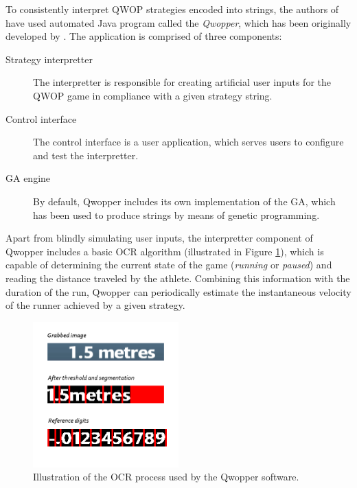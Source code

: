 To consistently interpret QWOP strategies encoded into strings, the authors of \cite{EvolvingQwopGaits} have used automated Java program called the \textit{Qwopper}, which has been originally developed by \cite{QwopEncoding}. The application is comprised of three components:
~
\begin{description}
	\item[Strategy interpretter]
	The interpretter is responsible for creating artificial user inputs for the QWOP game in compliance with a given strategy string.

	\item[Control interface]
	The control interface is a user application, which serves users to configure and test the interpretter.

	\item[GA engine]
	By default, Qwopper includes its own implementation of the GA, which has been used to produce strings by means of genetic programming.
\end{description}

Apart from blindly simulating user inputs, the interpretter component of Qwopper includes a basic OCR algorithm (illustrated in Figure \ref{figure:QWOP-OCR}), which is capable of determining the current state of the game (\textit{running} or \textit{paused}) and reading the distance traveled by the athlete. Combining this information with the duration of the run, Qwopper can periodically estimate the instantaneous velocity of the runner achieved by a given strategy.

\begin{figure}[ht]
	\centering
	\includegraphics[width=0.5\textwidth]{img/reading_digits.png}
	\caption[OCR process used by the Qwopper software.]{Illustration of the OCR process used by the Qwopper software. \cite{QwopEncoding}}
	\label{figure:QWOP-OCR}
\end{figure}

